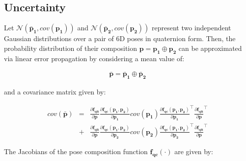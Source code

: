 \documentclass[a4paper,10pt]{report}
\begin{document}
\subsection{Uncertainty}

Let $\mathcal{N}(\mathbf{\bar{p}_1}, cov(\mathbf{p_1}))$ and 
$\mathcal{N}(\mathbf{\bar{p}_2}, cov(\mathbf{p_2}))$ represent
two independent Gaussian distributions over a pair of 6D 
poses in quaternion form.
Then, the probability distribution of their composition 
$\mathbf{p} = \mathbf{p_1} \oplus \mathbf{p_2}$
can be approximated via linear error propagation by considering 
a mean value of:

\begin{eqnarray}
\mathbf{\bar{p}} = \mathbf{\bar{p}_1} \oplus \mathbf{\bar{p}_2}
\end{eqnarray}

\noindent and a covariance matrix given by:

\begin{eqnarray}
cov(\mathbf{\bar{p}}) &=& 
\frac{\partial \mathbf{f_{qn}} }{\partial \mathbf{p}}
\frac{\partial \mathbf{f_{qc}}(\mathbf{p_1},\mathbf{p_2}) }{\partial \mathbf{p_1}}
cov(\mathbf{p_1})
\frac{\partial \mathbf{f_{qc}}(\mathbf{p_1},\mathbf{p_2}) }{\partial \mathbf{p_1}}^\top
\frac{\partial \mathbf{f_{qn}} }{\partial \mathbf{p}} ^\top
\nonumber \\ &+&
\frac{\partial \mathbf{f_{qn}} }{\partial \mathbf{p}}
\frac{\partial \mathbf{f_{qc}}(\mathbf{p_1},\mathbf{p_2}) }{\partial \mathbf{p_2}}
cov(\mathbf{p_2})
\frac{\partial \mathbf{f_{qc}}(\mathbf{p_1},\mathbf{p_2}) }{\partial \mathbf{p_2}}^\top
\frac{\partial \mathbf{f_{qn}} }{\partial \mathbf{p}}^\top
\end{eqnarray}

The Jacobians of the pose composition function $\mathbf{f_{qc}}(\cdot)$ are given by:
\end{document}
